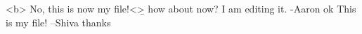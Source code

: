 <b> No, this is now my file!<\b>
how about now?
I am editing it. -Aaron ok
This is my file! --Shiva thanks
